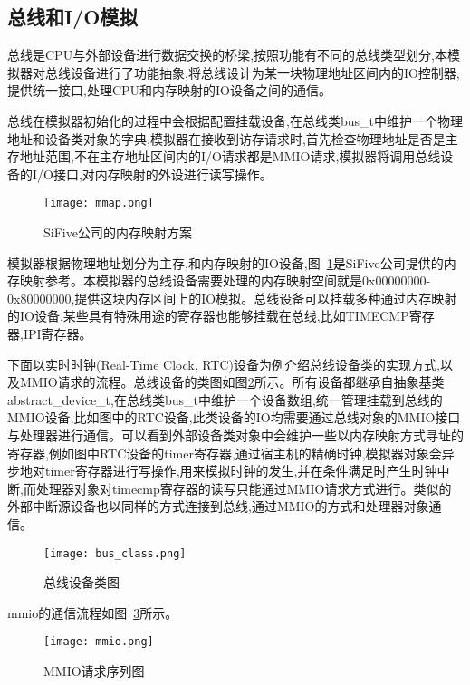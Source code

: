 \subsection{总线和I/O模拟}
总线是CPU与外部设备进行数据交换的桥梁,按照功能有不同的总线类型划分,本模拟器对总线设备进行了功能抽象,将总线设计为某一块物理地址区间内的IO控制器,提供统一接口,处理CPU和内存映射的IO设备之间的通信。


总线在模拟器初始化的过程中会根据配置挂载设备,在总线类bus\_t中维护一个物理地址和设备类对象的字典,模拟器在接收到访存请求时,首先检查物理地址是否是主存地址范围,不在主存地址区间内的I/O请求都是MMIO请求,模拟器将调用总线设备的I/O接口,对内存映射的外设进行读写操作。

\begin{figure}[H]
    \centering
    \texttt{[image: mmap.png]}
    \caption{SiFive公司的内存映射方案}
    \label{fig:mmap}
\end{figure}
模拟器根据物理地址划分为主存,和内存映射的IO设备,图~\ref{fig:mmap}是SiFive公司提供的内存映射参考。本模拟器的总线设备需要处理的内存映射空间就是0x00000000-0x80000000,提供这块内存区间上的IO模拟。总线设备可以挂载多种通过内存映射的IO设备,某些具有特殊用途的寄存器也能够挂载在总线,比如TIMECMP寄存器,IPI寄存器。

下面以实时时钟(Real-Time Clock, RTC)设备为例介绍总线设备类的实现方式,以及MMIO请求的流程。总线设备的类图如图\ref{fig:bus_class}所示。所有设备都继承自抽象基类abstract\_device\_t,在总线类bus\_t中维护一个设备数组,统一管理挂载到总线的MMIO设备,比如图中的RTC设备,此类设备的IO均需要通过总线对象的MMIO接口与处理器进行通信。可以看到外部设备类对象中会维护一些以内存映射方式寻址的寄存器,例如图中RTC设备的timer寄存器,通过宿主机的精确时钟,模拟器对象会异步地对timer寄存器进行写操作,用来模拟时钟的发生,并在条件满足时产生时钟中断,而处理器对象对timecmp寄存器的读写只能通过MMIO请求方式进行。类似的外部中断源设备也以同样的方式连接到总线,通过MMIO的方式和处理器对象通信。
\begin{figure}[H]
    \centering
    \texttt{[image: bus\_class.png]}
    \caption{总线设备类图}
    \label{fig:bus_class}
\end{figure}

mmio的通信流程如图~\ref{fig:mmio}所示。
\begin{figure}[H]
    \centering
    \texttt{[image: mmio.png]}
    \caption{MMIO请求序列图}
    \label{fig:mmio}
\end{figure}

